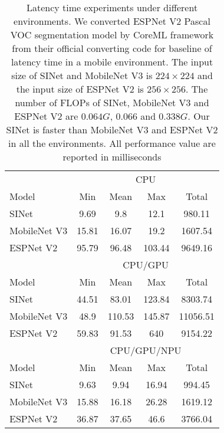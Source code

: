 \documentclass[10pt,twocolumn,letterpaper]{article}
\begin{document}
\begin{table}[ht]
   \begin{center}
\scriptsize
       
    \begin{tabular*}{0.45\textwidth}{@{\extracolsep{\fill}}l ||  cccc}
          & \multicolumn{4}{c}{CPU} \\
         
    Model  &  Min  &  Mean & Max   & Total \\
    \hline  \hline 
    SINet & 9.69  & 9.8   & 12.1  & 980.11 \\
    MobileNet V3 & 15.81 & 16.07 & 19.2  & 1607.54 \\
    ESPNet V2 & 95.79 & 96.48 & 103.44 & 9649.16 \\
     \hline \hline
          & \multicolumn{4}{c}{CPU/GPU} \\
           Model  &  Min  &  Mean & Max   & Total \\
           \hline   \hline 
    SINet & 44.51 & 83.01 & 123.84 & 8303.74 \\
    MobileNet V3 & 48.9  & 110.53 & 145.87 & 11056.51 \\
    ESPNet V2 & 59.83 & 91.53 & 640   & 9154.22 \\
    \hline \hline
          & \multicolumn{4}{c}{CPU/GPU/NPU} \\
           Model  &  Min  &  Mean & Max   & Total \\
           \hline   \hline 
    SINet & 9.63  & 9.94  & 16.94 & 994.45 \\
    MobileNet V3 & 15.88 & 16.18 & 26.28 & 1619.12 \\
    ESPNet V2 & 36.87 & 37.65 & 46.6  & 3766.04 \\
    
    \end{tabular*}\end{center}
  
    \caption{Latency time experiments under different environments. 
    We converted ESPNet V2 Pascal VOC segmentation model by CoreML framework from their official converting code for baseline of latency time in a mobile environment.  
    The input size of SINet and MobileNet V3 is $224 \times 224$ and the input size of ESPNet V2 is $256 \times 256$.
    The number of FLOPs of SINet, MobileNet V3 and ESPNet V2  are $0.064G$, $0.066$ and  $0.338G$.
    Our SINet is faster than MobileNet V3 and ESPNet V2 in all the environments.
    All performance value are reported in milliseconds}
    
    \label{tab:latency2}\end{table}
\end{document}
